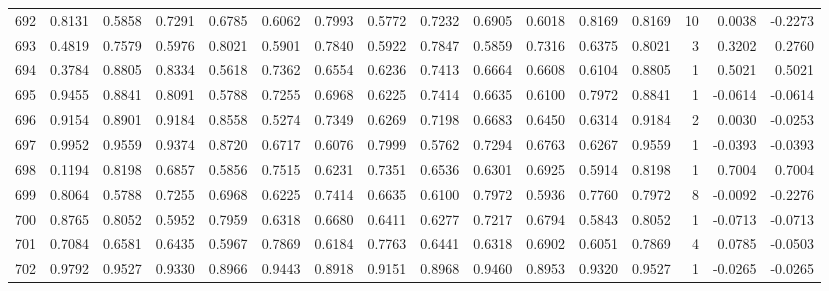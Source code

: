 \begin{tabular}{lrrrrrrrrrrrrrrr}
692 &      0.8131 &  0.5858 &  0.7291 &  0.6785 &  0.6062 &  0.7993 &  0.5772 &  0.7232 &  0.6905 &  0.6018 &   0.8169 &     0.8169 &     10 &                    0.0038 &                    -0.2273 \\
693 &      0.4819 &  0.7579 &  0.5976 &  0.8021 &  0.5901 &  0.7840 &  0.5922 &  0.7847 &  0.5859 &  0.7316 &   0.6375 &     0.8021 &      3 &                    0.3202 &                     0.2760 \\
694 &      0.3784 &  0.8805 &  0.8334 &  0.5618 &  0.7362 &  0.6554 &  0.6236 &  0.7413 &  0.6664 &  0.6608 &   0.6104 &     0.8805 &      1 &                    0.5021 &                     0.5021 \\
695 &      0.9455 &  0.8841 &  0.8091 &  0.5788 &  0.7255 &  0.6968 &  0.6225 &  0.7414 &  0.6635 &  0.6100 &   0.7972 &     0.8841 &      1 &                   -0.0614 &                    -0.0614 \\
696 &      0.9154 &  0.8901 &  0.9184 &  0.8558 &  0.5274 &  0.7349 &  0.6269 &  0.7198 &  0.6683 &  0.6450 &   0.6314 &     0.9184 &      2 &                    0.0030 &                    -0.0253 \\
697 &      0.9952 &  0.9559 &  0.9374 &  0.8720 &  0.6717 &  0.6076 &  0.7999 &  0.5762 &  0.7294 &  0.6763 &   0.6267 &     0.9559 &      1 &                   -0.0393 &                    -0.0393 \\
698 &      0.1194 &  0.8198 &  0.6857 &  0.5856 &  0.7515 &  0.6231 &  0.7351 &  0.6536 &  0.6301 &  0.6925 &   0.5914 &     0.8198 &      1 &                    0.7004 &                     0.7004 \\
699 &      0.8064 &  0.5788 &  0.7255 &  0.6968 &  0.6225 &  0.7414 &  0.6635 &  0.6100 &  0.7972 &  0.5936 &   0.7760 &     0.7972 &      8 &                   -0.0092 &                    -0.2276 \\
700 &      0.8765 &  0.8052 &  0.5952 &  0.7959 &  0.6318 &  0.6680 &  0.6411 &  0.6277 &  0.7217 &  0.6794 &   0.5843 &     0.8052 &      1 &                   -0.0713 &                    -0.0713 \\
701 &      0.7084 &  0.6581 &  0.6435 &  0.5967 &  0.7869 &  0.6184 &  0.7763 &  0.6441 &  0.6318 &  0.6902 &   0.6051 &     0.7869 &      4 &                    0.0785 &                    -0.0503 \\
702 &      0.9792 &  0.9527 &  0.9330 &  0.8966 &  0.9443 &  0.8918 &  0.9151 &  0.8968 &  0.9460 &  0.8953 &   0.9320 &     0.9527 &      1 &                   -0.0265 &                    -0.0265 \\

\end{tabular}
